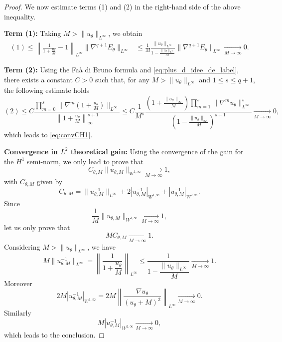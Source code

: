 \begin{proof}
	We now estimate terms (1) and (2) in the right-hand side of the above inequality.


	\textbf{Term (1):}
	Taking $M> \|u_{\theta}\|_{L^\infty}$, we obtain
	\begin{align*}
		(1)\le	\left\|\frac{1}{1+\frac{u_\theta}{M}}-1\right\|_{L^\infty}\|\nabla^{q+1}E_\theta\|_{L^\infty}
		& \le \frac{1}{M} \frac{\|u_\theta\|_{L^\infty}}{1-\frac{\|u_\theta\|_{L^\infty}}{M}} \|\nabla^{q+1}E_\theta\|_{L^\infty} \underset{M\to\infty}{\longrightarrow}0.
	\end{align*}

	\textbf{Term (2):} Using the Fa\`{a} di Bruno formula and \eqref{eq:plus_d_idee_de_label}, there exists a constant $C>0$ such that, for any $M> \|u_{\theta}\|_{L^\infty}$ and $1\le s\le q+1$,
	the following estimate holds
	\begin{equation*}
	(2)	\leqslant C\frac{\prod_{m=0}^s\|\nabla^m\left(1+\frac{u_\theta}{M}\right)\|_{L^{\infty}}}{\left\|1+\frac{u_\theta}{M}\right\|_{\infty}^{s+1}}
\leqslant C\dfrac{1}{M^{s}}\frac{\left(1+\frac{\|u_\theta\|_{\infty}}{M}\right)\prod_{m=1}^s\|\nabla^m u_\theta\|_{L^{\infty}}^{s}}{\left(1-\frac{\|u_\theta\|_{\infty}}{M}\right)^{s+1}}
		\underset{M\to\infty}{\longrightarrow}0,
	\end{equation*}
	which leads to \eqref{eq:convCH1}.

\textbf{Convergence in $L^2$ theoretical gain:} Using the convergence of the gain for the $H^1$ semi-norm, we only lead to prove that
$$C_{\theta,M}\|u_{\theta,M}\|_{W^{1,\infty}}
\underset{M\rightarrow\infty}{\longrightarrow}1,$$
with $C_{\theta,M}$ given by
$$C_{\theta,M}=\|u_{\theta,M}^{-1}\|_{L^{\infty}}
		+2|u_{\theta,M}^{-1}|_{W^{1,\infty}}
		+|u_{\theta,M}^{-1}|_{W^{2,\infty}}.$$
Since
	$$\dfrac{1}{M}\|u_{\theta,M}\|_{W^{1,\infty}}\underset{M\rightarrow\infty}{\longrightarrow}1,$$
	let us only prove that
$$MC_{\theta,M}
\underset{M\rightarrow\infty}{\longrightarrow}1.$$
Considering $M> \|u_{\theta}\|_{L^\infty}$, we have
$$M\|u_{\theta,M}^{-1}\|_{L^{\infty}}
=\left\|\dfrac{1}{1+\dfrac{u_\theta}{M}}\right\|_{L^{\infty}}
\leqslant \dfrac{1}{1-\dfrac{\|u_\theta\|_{L^\infty}}{M}}
\underset{M\rightarrow\infty}{\longrightarrow}1.$$
Moreover
$$2M|u_{\theta,M}^{-1}|_{W^{1,\infty}}
=2M\left\|\dfrac{\nabla u_{\theta}}{(u_{\theta}+M)^2}\right\|_{L^{\infty}}
\underset{M\rightarrow\infty}{\longrightarrow}0.$$
Similarly
$$M|u_{\theta,M}^{-1}|_{W^{2,\infty}}
\underset{M\rightarrow\infty}{\longrightarrow}0,$$
which leads to the conclusion.

\end{proof}
